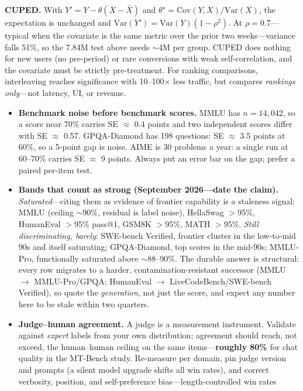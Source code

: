 \textbf{CUPED.} With $Y' = Y - \theta(X - \bar{X})$ and $\theta^{\star} =
\mathrm{Cov}(Y,X)/\mathrm{Var}(X)$, the expectation is unchanged and
$\mathrm{Var}(Y') = \mathrm{Var}(Y)(1 - \rho^{2})$. At $\rho = 0.7$---typical
when the covariate is the same metric over the prior two weeks---variance falls
51\%, so the 7.84M test above needs $\sim$4M per group. CUPED does nothing for
new users (no pre-period) or rare conversions with weak self-correlation, and
the covariate must be strictly pre-treatment. For ranking comparisons,
interleaving reaches significance with 10--100$\times$ less traffic, but
compares \emph{rankings only}---not latency, UI, or revenue.

\begin{itemize}[leftmargin=*,itemsep=1pt]
\item \textbf{Benchmark noise before benchmark scores.} MMLU has
$n = 14{,}042$, so a score near 70\% carries SE $\approx$ 0.4 points and two
independent scores differ with SE $\approx$ 0.57. GPQA-Diamond has 198
questions: SE $\approx$ 3.5 points at 60\%, so a 5-point gap is noise. AIME is
30 problems a year: a single run at 60--70\% carries SE $\approx$ 9 points.
Always put an error bar on the gap; prefer a paired per-item test.
\item \textbf{Bands that count as strong (September 2026---date the claim).}
\emph{Saturated}---citing them as evidence of frontier capability is a staleness
signal: MMLU (ceiling $\sim$90\%, residual is label noise), HellaSwag $>$95\%,
HumanEval $>$95\% pass@1, GSM8K $>$95\%, MATH $>$95\%. \emph{Still
discriminating, barely}: SWE-bench Verified, frontier cluster in the low-to-mid
90s and itself saturating; GPQA-Diamond, top scores in the mid-90s; MMLU-Pro,
functionally saturated above $\sim$88--90\%. The durable answer is structural:
every row migrates to a harder, contamination-resistant successor (MMLU
$\rightarrow$ MMLU-Pro/GPQA; HumanEval $\rightarrow$ LiveCodeBench/SWE-bench
Verified), so quote the \emph{generation}, not just the score, and expect any
number here to be stale within two quarters.
\item \textbf{Judge--human agreement.} A judge is a measurement instrument. Validate
against \emph{expert} labels from your own distribution; agreement should reach,
not exceed, the human--human ceiling on the same items---\textbf{roughly 80\%}
for chat quality in the MT-Bench study. Re-measure per domain, pin judge version
and prompts (a silent model upgrade shifts all win rates), and correct
verbosity, position, and self-preference bias---length-controlled win rates

\end{itemize}
